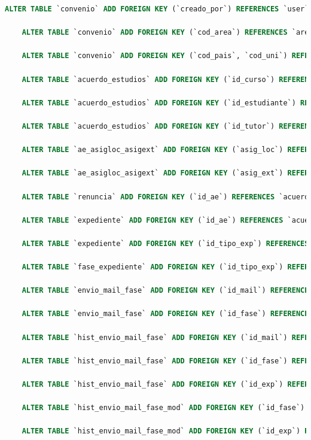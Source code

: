 \begin{lstlisting}[language=sql]
	ALTER TABLE `convenio` ADD FOREIGN KEY (`creado_por`) REFERENCES `user` (`id`);
	
	ALTER TABLE `convenio` ADD FOREIGN KEY (`cod_area`) REFERENCES `area` (`cod_isced`);
	
	ALTER TABLE `convenio` ADD FOREIGN KEY (`cod_pais`, `cod_uni`) REFERENCES `universidad` (`cod_pais`, `cod_uni`);
	
	ALTER TABLE `acuerdo_estudios` ADD FOREIGN KEY (`id_curso`) REFERENCES `curso` (`id`);
	
	ALTER TABLE `acuerdo_estudios` ADD FOREIGN KEY (`id_estudiante`) REFERENCES `estudiante` (`id_usuario`);
	
	ALTER TABLE `acuerdo_estudios` ADD FOREIGN KEY (`id_tutor`) REFERENCES `user` (`id`);
	
	ALTER TABLE `ae_asigloc_asigext` ADD FOREIGN KEY (`asig_loc`) REFERENCES `asignatura` (`id`);
	
	ALTER TABLE `ae_asigloc_asigext` ADD FOREIGN KEY (`asig_ext`) REFERENCES `asignatura_ext` (`id`);
	
	ALTER TABLE `renuncia` ADD FOREIGN KEY (`id_ae`) REFERENCES `acuerdo_estudios` (`id`);
	
	ALTER TABLE `expediente` ADD FOREIGN KEY (`id_ae`) REFERENCES `acuerdo_estudios` (`id`);
	
	ALTER TABLE `expediente` ADD FOREIGN KEY (`id_tipo_exp`) REFERENCES `tipo_expediente` (`id`);
	
	ALTER TABLE `fase_expediente` ADD FOREIGN KEY (`id_tipo_exp`) REFERENCES `tipo_expediente` (`id`);
	
	ALTER TABLE `envio_mail_fase` ADD FOREIGN KEY (`id_mail`) REFERENCES `mail_predef` (`id`);
	
	ALTER TABLE `envio_mail_fase` ADD FOREIGN KEY (`id_fase`) REFERENCES `fase_expediente` (`id`);
	
	ALTER TABLE `hist_envio_mail_fase` ADD FOREIGN KEY (`id_mail`) REFERENCES `mail_predef` (`id`);
	
	ALTER TABLE `hist_envio_mail_fase` ADD FOREIGN KEY (`id_fase`) REFERENCES `fase_expediente` (`id`);
	
	ALTER TABLE `hist_envio_mail_fase` ADD FOREIGN KEY (`id_exp`) REFERENCES `expediente` (`id`);
	
	ALTER TABLE `hist_envio_mail_fase_mod` ADD FOREIGN KEY (`id_fase`) REFERENCES `fase_expediente` (`id`);
	
	ALTER TABLE `hist_envio_mail_fase_mod` ADD FOREIGN KEY (`id_exp`) REFERENCES `expediente` (`id`);
	

\end{lstlisting}
